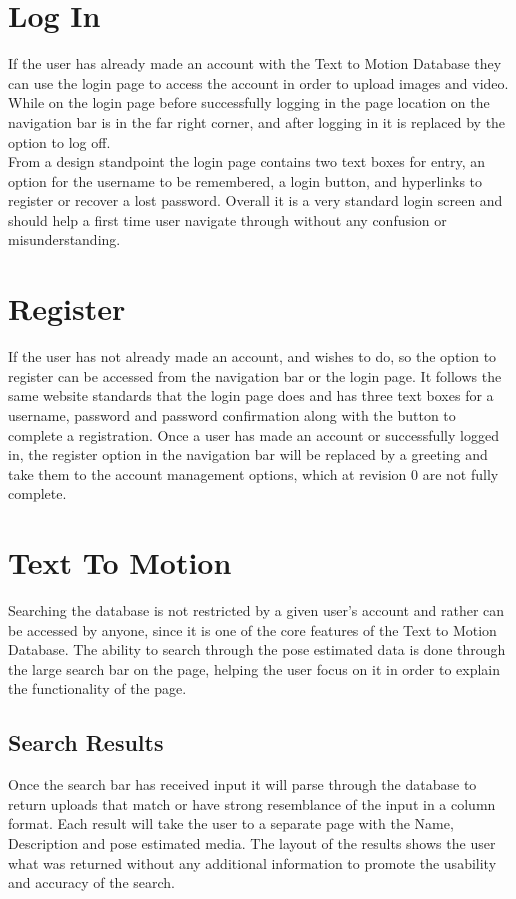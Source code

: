 \documentclass{scrreprt}
\begin{document}
\section{Log In}
If the user has already made an account with the Text to Motion Database they can use the login page to access the account in order to upload images and video. While on the login page before successfully logging in the page location on the navigation bar is in the far right corner, and after logging in it is replaced by the option to log off.
\\
From a design standpoint the login page contains two text boxes for entry, an option for the username to be remembered, a login button, and hyperlinks to register or recover a lost password. Overall it is a very standard login screen and should help a first time user navigate through without any confusion or misunderstanding.


\section{Register}
If the user has not already made an account, and wishes to do, so the option to register can be accessed from the navigation bar or the login page. It follows the same website standards that the login page does and has three text boxes for a username, password and password confirmation along with the button to complete a registration. Once a user has made an account or successfully logged in, the register option in the navigation bar will be replaced by a greeting and take them to the account management options, which at revision 0 are not fully complete.

\section{Text To Motion}
Searching the database is not restricted by a given user's account and rather can be accessed by anyone, since it is one of the core features of the Text to Motion Database. The ability to search through the pose estimated data is done through the large search bar on the page, helping the user focus on it in order to explain the functionality of the page.

\subsection{Search Results}
Once the search bar has received input it will parse through the database to return uploads that match or have strong resemblance of the input in a column format. Each result will take the user to a separate page with the Name, Description and pose estimated media. The layout of the results shows the user what was returned without any additional information to promote the usability and accuracy of the search.
\end{document}
